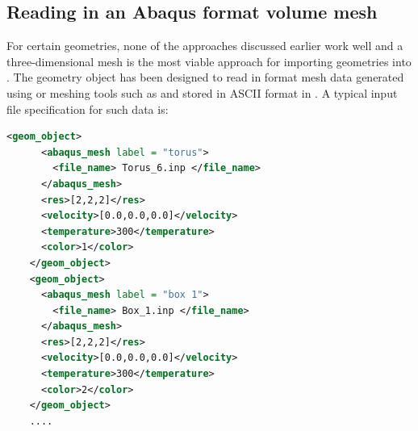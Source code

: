 \subsection{Reading in an Abaqus format volume mesh}
\begin{minipage}[t]{0.6\textwidth}
  \vspace{0pt}
  For certain geometries, none of the approaches discussed earlier work
  well and a three-dimensional mesh is the most viable approach
  for importing geometries into \Vaango.  The  geometry
  object has been designed to read in  format mesh
  data generated using  or meshing tools such as 
  and stored in ASCII format in .
  A typical input file specification for such data is:
  \begin{lstlisting}[language=XML]
    <geom_object>
      <abaqus_mesh label = "torus">
        <file_name> Torus_6.inp </file_name>
      </abaqus_mesh>
      <res>[2,2,2]</res>
      <velocity>[0.0,0.0,0.0]</velocity>
      <temperature>300</temperature>
      <color>1</color>
    </geom_object>
    <geom_object>
      <abaqus_mesh label = "box 1">
        <file_name> Box_1.inp </file_name>
      </abaqus_mesh>
      <res>[2,2,2]</res>
      <velocity>[0.0,0.0,0.0]</velocity>
      <temperature>300</temperature>
      <color>2</color>
    </geom_object>
    ....
  \end{lstlisting}
\end{minipage}
\hspace{12pt}
